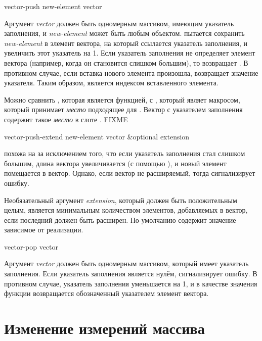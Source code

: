 \begin{defun}[Функция]
vector-push new-element vector

Аргумент \emph{vector} должен быть одномерным массивом, имеющим указатель
заполнения, и \emph{new-element} может быть любым объектом.
 пытается сохранить \emph{new-element} в элемент вектора, на
который ссылается указатель заполнения, и увеличить этот указатель на 1. Если
указатель заполнения не определяет элемент вектора (например, когда он
становится слишком большим), то  возвращает {\false}. В
противном случае, если вставка нового элемента произошла, 
возвращает  значение указателя. Таким образом, 
является индексом вставленного элемента.

Можно сравнить , которая является функцией, с ,
который являет макросом, который принимает \emph{место} подходящее для
.
Вектор с указателем заполнения содержит такое \emph{место} в слоте
. FIXME
\end{defun}

\begin{defun}[Функция]
vector-push-extend new-element vector &optional extension

 похожа на  за исключением того, что
если указатель заполнения стал слишком большим, длина вектора увеличивается (с
помощью ), и новый элемент помещается в вектор.
Однако, если вектор не расширяемый, тогда  сигнализирует
ошибку.

Необязательный аргумент \emph{extension}, который должен быть положительным
целым, является минимальным количеством элементов, добавляемых в вектор, если
последний должен быть расширен. По-умолчанию содержит значение зависимое от
реализации.
\end{defun}

\begin{defun}[Функция]
vector-pop vector

Аргумент \emph{vector} должен быть одномерным массивом, который имеет указатель
заполнения.
Если указатель заполнения является нулём,  сигнализирует ошибку.
В противном случае, указатель заполнения уменьшается на 1, и в качестве значения
функции возвращается обозначенный указателем элемент вектора.
\end{defun}

\section{Изменение измерений массива}

